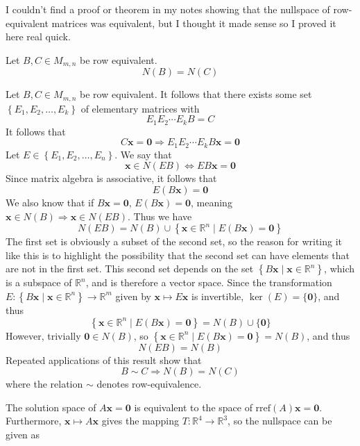 \documentclass{article}
\theoremstyle{definition}
\renewenvironment{proof}[1][\proofname]{\begin{replacementproof}}{\end{replacementproof}}
\newenvironment{solution}[1][]{\begin{replacementsoln}}{\end{replacementsoln}}
\begin{document}
\begin{solution}
  I couldn't find a proof or theorem in my notes showing that the nullspace of row-equivalent matrices was equivalent, but I thought it made sense so I proved it here real quick.\\
  \begin{lemma}
    Let \(B,C\in M_{m,n}\) be row equivalent.
    \[
      N(B)=N(C)
    \]
  \end{lemma}
  \begin{proof}
  Let \(B,C\in M_{m,n}\) be row equivalent. It follows that there exists some set \(\left\{E_1,E_2,\ldots,E_k\right\}\) of elementary matrices with 
  \[
    E_1 E_2 \cdots E_k B = C
  \]
  It follows that
  \[
    C \mathbf{x}=\mathbf{0} \Longrightarrow E_1 E_2 \cdots E_k B \mathbf{x}=\mathbf{0}
  \]
  Let \(E\in\left\{ E_1,E_2,\ldots,E_n \right\} \). We say that
  \[
    \mathbf{x}\in N(EB) \iff EB \mathbf{x}=\mathbf{0}
  \]
  Since matrix algebra is associative, it follows that
  \[
    E \left( B \mathbf{x} \right)= \mathbf{0}
  \]
  We also know that if \(B \mathbf{x}=\mathbf{0}\), \(E(B \mathbf{x})=\mathbf{0}\), meaning \(\mathbf{x}\in N(B)\Longrightarrow \mathbf{x}\in N(EB)\). Thus we have
  \[
    N(EB)=N(B)\cup \left\{ \mathbf{x}\in\mathbb{R}^n \mid E(B \mathbf{x})=\mathbf{0}\right\}
  \]
  The first set is obviously a subset of the second set, so the reason for writing it like this is to highlight the possibility that the second set can have elements that are not in the first set. This second set depends on the set \(\left\{ B \mathbf{x} \mid \mathbf{x}\in\mathbb{R}^n \right\} \), which is a subspace of \(\mathbb{R}^n\), and is therefore a vector space. Since the transformation \(E:\left\{ B \mathbf{x} \mid \mathbf{x}\in\mathbb{R}^n \right\}\to \mathbb{R}^m \) given by \(\mathbf{x}\mapsto E \mathbf{x}\) is invertible, \(\ker (E)=\{ \mathbf{0} \} \), and thus
  \[\left\{ \mathbf{x}\in\mathbb{R}^n \mid E(B \mathbf{x})=\mathbf{0} \right\}=N(B)\cup \{ \mathbf{0} \}  \]
  However, trivially \(\mathbf{0}\in N(B)\), so \(\left\{ \mathbf{x}\in\mathbb{R}^n \mid E(B \mathbf{x})=\mathbf{0} \right\}=N(B)\), and thus 
  \[
    N(EB)=N(B)
  \]
  Repeated applications of this result show that 
  \[
    B\sim C\Longrightarrow N \left(B \right) = N(C)
  \]
  where the relation \(\sim \) denotes row-equivalence.
  \end{proof}
  The solution space of \(A \mathbf{x}=\mathbf{0}\) is equivalent to the space of \(\text{rref} (A) \mathbf{x}=\mathbf{0}\). Furthermore, \(\mathbf{x}\mapsto A \mathbf{x}\) gives the mapping \(T:\mathbb{R}^4 \to \mathbb{R}^3\), so the nullspace can be given as

\end{solution}
\end{document}
